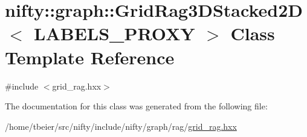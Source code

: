 \hypertarget{classnifty_1_1graph_1_1GridRag3DStacked2D}{}\section{nifty\+:\+:graph\+:\+:Grid\+Rag3\+D\+Stacked2D$<$ L\+A\+B\+E\+L\+S\+\_\+\+P\+R\+O\+XY $>$ Class Template Reference}
\label{classnifty_1_1graph_1_1GridRag3DStacked2D}


{\ttfamily \#include $<$grid\+\_\+rag.\+hxx$>$}



The documentation for this class was generated from the following file\+:\begin{DoxyCompactItemize}
\item 
/home/tbeier/src/nifty/include/nifty/graph/rag/\hyperlink{grid__rag_8hxx}{grid\+\_\+rag.\+hxx}\end{DoxyCompactItemize}
